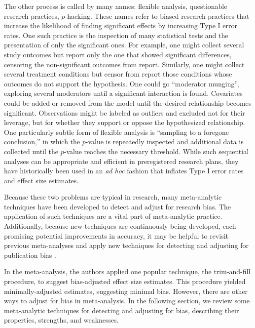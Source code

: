 \documentclass[man]{apa6}
\begin{document}
The other process is called by many names: flexible analysis, questionable research practices, $p$-hacking. These names refer to biased research practices that increase the likelihood of finding significant effects by increasing Type I error rates. One such practice is the inspection of many statistical tests and the presentation of only the significant ones. For example, one might collect several study outcomes but report only the one that showed significant differences, censoring the non-significant outcomes from report. Similarly, one might collect several treatment conditions but censor from report those conditions whose outcomes do not support the hypothesis. One could go ``moderator munging'', exploring several moderators until a significant interaction is found. Covariates could be added or removed from the model until the desired relationship becomes significant. Observations might be labeled as outliers and excluded not for their leverage, but for whether they support or oppose the hypothesized relationship. One particularly subtle form of flexible analysis is ``sampling to a foregone conclusion,'' in which the $p$-value is repeatedly inspected and additional data is collected until the $p$-value reaches the necessary threshold. While such sequential analyses can be appropriate and efficient in preregistered research plans, they have historically been used in an {\em ad hoc} fashion that inflates Type I error rates and effect size estimates.

Because these two problems are typical in research, many meta-analytic techniques have been developed to detect and adjust for research bias. The application of such techniques are a vital part of meta-analytic practice. Additionally, because new techniques are continuously being developed, each promising potential improvements in accuracy, it may be helpful to revisit previous meta-analyses and apply new techniques for detecting and adjusting for publication bias \citep{Lakens:etal:inpress}. %

In the \citet{Anderson:etal:2010} meta-analysis, the authors applied one popular technique, the trim-and-fill procedure, to suggest bias-adjusted effect size estimates. This procedure yielded minimally-adjusted estimates, suggesting minimal bias. However, there are other ways to adjust for bias in meta-analysis. In the following section, we review some meta-analytic techniques for detecting and adjusting for bias, describing their properties, strengths, and weaknesses.
\end{document}
